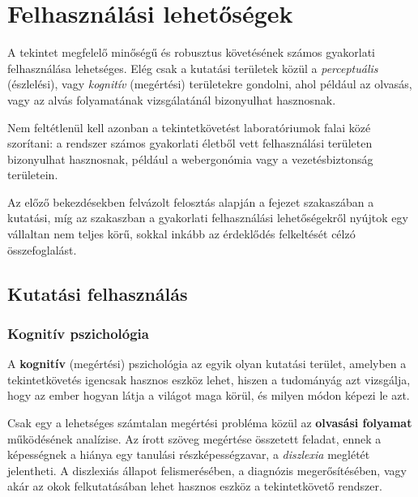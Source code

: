 \chapter{Felhasználási lehetőségek}\label{sect:felhasznalas}

A tekintet megfelelő minőségű és robusztus követésének számos gyakorlati felhasználása lehetséges. Elég csak a kutatási területek közül a \emph{perceptuális} (észlelési), vagy \emph{kognitív} (megértési) területekre gondolni, ahol például az olvasás, vagy az alvás folyamatának vizsgálatánál bizonyulhat hasznosnak.

Nem feltétlenül kell azonban a tekintetkövetést laboratóriumok falai közé szorítani: a rendszer számos gyakorlati életből vett felhasználási területen bizonyulhat hasznosnak, például a webergonómia vagy a vezetésbiztonság területein.

\bigskip

Az előző bekezdésekben felvázolt felosztás alapján a fejezet  szakaszában a kutatási, míg az  szakaszban a gyakorlati felhasználási lehetőségekről nyújtok egy vállaltan nem teljes körű, sokkal inkább az érdeklődés felkeltését célzó összefoglalást.

\section{Kutatási felhasználás}\label{sect:tudomanyos}

\subsection{Kognitív pszichológia}\label{sect:kognitiv}

A \textbf{kognitív} (megértési) pszichológia az egyik olyan kutatási terület, amelyben a tekintetkövetés igencsak hasznos eszköz lehet, hiszen a tudományág azt vizsgálja, hogy az ember hogyan látja a világot maga körül, és milyen módon képezi le azt.

\bigskip

Csak egy a lehetséges számtalan megértési probléma közül az \textbf{olvasási folyamat} működésének analízise. Az írott szöveg megértése összetett feladat, ennek a képességnek a hiánya egy tanulási részképességzavar, a \emph{diszlexia} meglétét jelentheti. A diszlexiás állapot felismerésében, a diagnózis megerősítésében, vagy akár az okok felkutatásában lehet hasznos eszköz a tekintetkövető rendszer.

